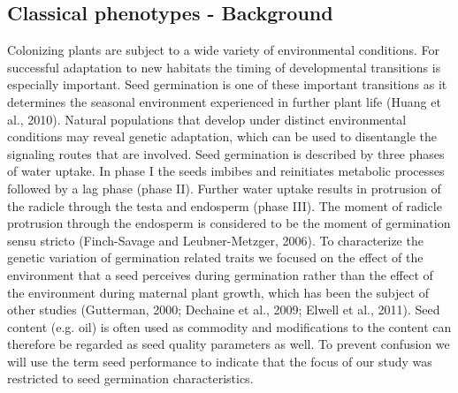 \documentclass[8pt, twoside, a5paper]{report}
\begin{document}
\subsection{Classical phenotypes - Background}
Colonizing plants are subject to a wide variety of environmental conditions. For successful adaptation to new habitats the timing 
of developmental transitions is especially important. Seed germination is one of these important transitions as it determines 
the seasonal environment experienced in further plant life (Huang et al., 2010). Natural populations that develop under distinct 
environmental conditions may reveal genetic adaptation, which can be used to disentangle the signaling routes that are involved. 
Seed germination is described by three phases of water uptake. In phase I the seeds imbibes and reinitiates metabolic processes 
followed by a lag phase (phase II). Further water uptake results in protrusion of the radicle through the testa and endosperm 
(phase III). The moment of radicle protrusion through the endosperm is considered to be the moment of germination sensu stricto 
(Finch-Savage and Leubner-Metzger, 2006). To characterize the genetic variation of germination related traits we focused on the 
effect of the environment that a seed perceives during germination rather than the effect of the environment during maternal 
plant growth, which has been the subject of other studies (Gutterman, 2000; Dechaine et al., 2009; Elwell et al., 2011). Seed 
content (e.g. oil) is often used as commodity and modifications to the content can therefore be regarded as seed quality parameters 
as well. To prevent confusion we will use the term seed performance to indicate that the focus of our study was restricted to 
seed germination characteristics.
\end{document}

